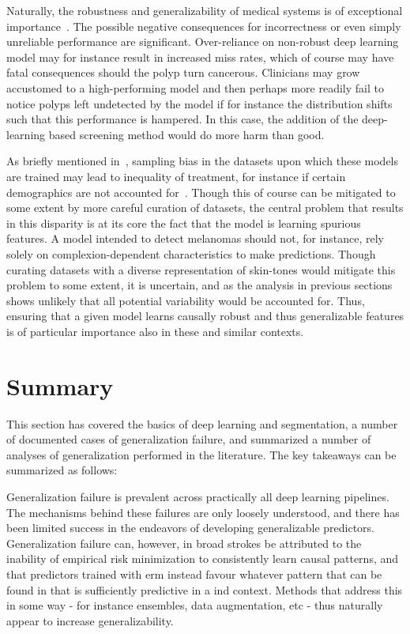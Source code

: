     Naturally, the robustness and generalizability of medical systems is of exceptional importance~\cite{ethics_1}. The possible negative consequences for incorrectness or even simply unreliable performance are significant. Over-reliance on non-robust deep learning model may for instance result in increased miss rates, which of course may have fatal consequences should the polyp turn cancerous. Clinicians may grow accustomed to a high-performing model and then perhaps more readily fail to notice polyps left undetected by the model if for instance the distribution shifts such that this performance is hampered. In this case, the addition of the deep-learning based screening method would do more harm than good.
    
    As briefly mentioned in~, sampling bias in the datasets upon which these models are trained may lead to inequality of treatment, for instance if certain demographics are not accounted for~\cite{social_consequence_1}. Though this of course can be mitigated to some extent by more careful curation of datasets, the central problem that results in this disparity is at its core the fact that the model is learning spurious features. A model intended to detect melanomas should not, for instance, rely solely on complexion-dependent characteristics to make predictions. Though curating datasets with a diverse representation of skin-tones would mitigate this problem to some extent, it is uncertain, and as the analysis in previous sections shows unlikely that all potential variability would be accounted for. Thus, ensuring that a given model learns causally robust and thus generalizable features is of particular importance also in these and similar contexts. 
    
    
\section{Summary}
This section has covered the basics of deep learning and segmentation, a number of documented cases of generalization failure, and summarized a number of analyses of generalization performed in the literature. The key takeaways can be summarized as follows: 

Generalization failure is prevalent across practically all deep learning pipelines. The mechanisms behind these failures are only loosely understood, and there has been limited success in the endeavors of developing generalizable predictors. Generalization failure can, however, in broad strokes be attributed to the inability of empirical risk minimization to consistently learn causal patterns, and that predictors trained with \gls{erm} instead favour whatever pattern that can be found in that is sufficiently predictive in a \gls{ind} context. Methods that address this in some way - for instance ensembles, data augmentation, etc - thus naturally appear to increase generalizability. 

